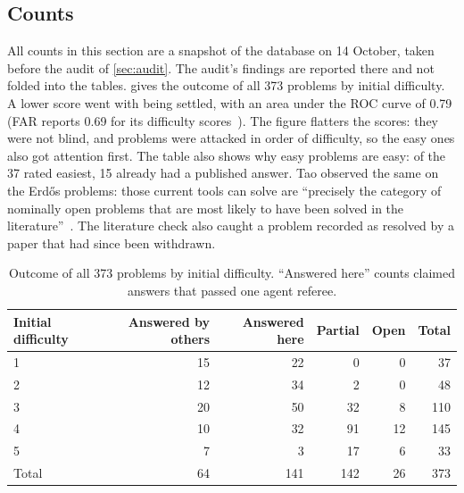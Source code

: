 \documentclass[11pt]{amsart}
\begin{document}
\subsection{Counts}
All counts in this section are a snapshot of the database on 14 October, taken
before the audit of \cref{sec:audit}. The audit's findings are reported there
and not folded into the tables.  gives the outcome of all
373 problems by initial difficulty. A lower score went with being settled, with
an area under the ROC curve of 0.79 (FAR reports 0.69 for its difficulty
scores~\cite{far}). The figure flatters the scores: they were not blind, and
problems were attacked in order of difficulty, so the easy ones also got
attention first. The table also shows why easy problems are easy: of the 37
rated easiest, 15 already had a published answer. Tao observed the same on the
Erdős problems: those current tools can solve are ``precisely the category of
nominally open problems that are most likely to have been solved in the
literature''~\cite{tao-lowhanging}. The literature check also caught a problem
recorded as resolved by a paper that had since been withdrawn.

\begin{table}[ht]
  \centering
  \begin{tabular}{lrrrrr}
    \toprule
    Initial difficulty & Answered by others & Answered here & Partial & Open & Total \\
    \midrule
    1                  & 15                 & 22            & 0       & 0    & 37    \\
    2                  & 12                 & 34            & 2       & 0    & 48    \\
    3                  & 20                 & 50            & 32      & 8    & 110   \\
    4                  & 10                 & 32            & 91      & 12   & 145   \\
    5                  & 7                  & 3             & 17      & 6    & 33    \\
    \midrule
    Total              & 64                 & 141           & 142     & 26   & 373   \\
    \bottomrule
  \end{tabular}
  \caption{Outcome of all 373 problems by initial difficulty. ``Answered
    here'' counts claimed answers that passed one agent
    referee.}\label{tab:difficulty}
\end{table}
\end{document}
